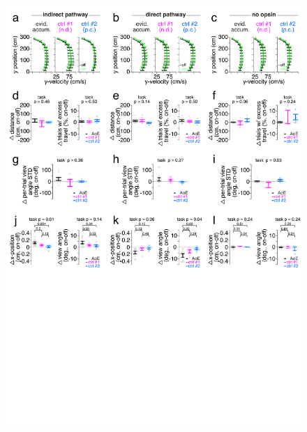 \begin{figure}[t!]
  \begin{center}
    \includegraphics[width=0.90\linewidth]{ch7-appendix1/appendix1-figures/ExtData_Fig6.pdf}

\end{center}
\end{figure}
